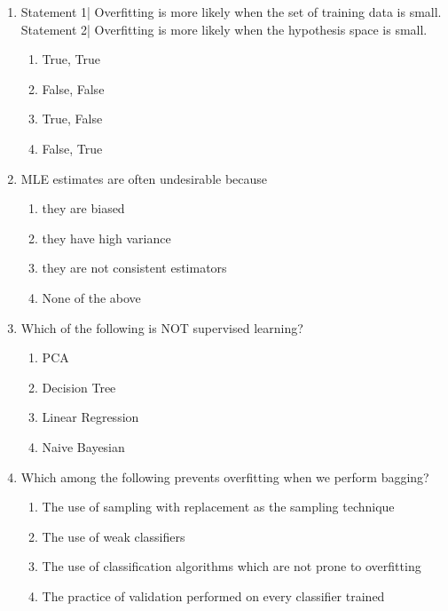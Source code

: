 \documentclass[{\csname fa0013Font0\endcsname\char"0032}{\csname fa0014Font0\endcsname\char"0031}pt]{article}
\begin{document}
\begin{enumerate}[label=\arabic*.]
\begin{enumerate}[label=(\alph*)]
    \item True, True
    \item False, False
    \item True, False
    \item False, True
\end{enumerate}
\item Statement 1| Overfitting is more likely when the set of training data is small. Statement 2| Overfitting is more likely when the hypothesis space is small.
\begin{enumerate}[label=(\alph*)]
    \item True, True
    \item False, False
    \item True, False
    \item False, True
\end{enumerate}
\item MLE estimates are often undesirable because
\begin{enumerate}[label=(\alph*)]
    \item they are biased
    \item they have high variance
    \item they are not consistent estimators
    \item None of the above
\end{enumerate}
\item Which of the following is NOT supervised learning?
\begin{enumerate}[label=(\alph*)]
    \item PCA
    \item Decision Tree
    \item Linear Regression
    \item Naive Bayesian
\end{enumerate}
\item Which among the following prevents overfitting when we perform bagging?
\begin{enumerate}[label=(\alph*)]
    \item The use of sampling with replacement as the sampling technique
    \item The use of weak classifiers
    \item The use of classification algorithms which are not prone to overfitting
    \item The practice of validation performed on every classifier trained
\end{enumerate}

\end{enumerate}
\end{document}
